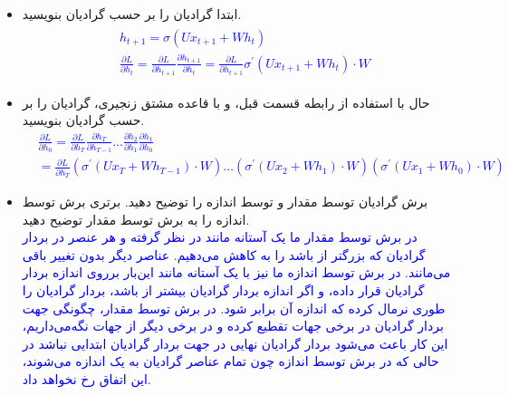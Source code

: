 \documentclass[12pt]{article}
\begin{document}
\begin{enumerate}
    \begin{itemize}
        \item ابتدا گرادیان  را بر حسب گرادیان  بنویسید.\\
        \textcolor{blue}{
        $$
            \begin{aligned}
            &\begin{gathered}
            h_{t+1}=\sigma\left(U x_{t+1}+W h_t\right) \\
            \frac{\partial L}{\partial h_t}=\frac{\partial L}{\partial h_{t+1}} \frac{\partial h_{t+1}}{\partial h_t}=\frac{\partial L}{\partial h_{t+1}} \sigma^{\prime}\left(U x_{t+1}+W h_t\right) \cdot W
            \end{gathered}
            \end{aligned}
        $$
        }
        \item 	حال با استفاده از رابطه قسمت قبل، و با قاعده مشتق زنجیری، گرادیان  را بر حسب گرادیان  بنویسید.\\
        \textcolor{blue}{
        $$
            \begin{aligned}
            & \frac{\partial L}{\partial h_0}=\frac{\partial L}{\partial h_T} \frac{\partial h_T}{\partial h_{T-1}} \ldots \frac{\partial h_2}{\partial h_1} \frac{\partial h_1}{\partial h_0} \\
            & =\frac{\partial L}{\partial h_T}\left(\sigma^{\prime}\left(U x_T+W h_{T-1}\right) \cdot W\right) \ldots\left(\sigma^{\prime}\left(U x_2+W h_1\right) \cdot W\right)\left(\sigma^{\prime}\left(U x_1+W h_0\right) \cdot W\right)
            \end{aligned}
        $$
        }
        \item برش گرادیان توسط مقدار و توسط اندازه را توضیح دهید. برتری برش توسط اندازه را به برش توسط مقدار توضیح دهید.\\
        \textcolor{blue}{
        در برش توسط مقدار ما یک آستانه مانند در نظر گرفته و هر عنصر در بردار گرادیان که بزرگتر از باشد را به کاهش می‌دهیم. عناصر دیگر بدون تغییر باقی می‌مانند. در برش توسط اندازه ما نیز با یک آستانه مانند این‌بار برروی اندازه بردار گرادیان قرار داده، و اگر اندازه بردار گرادیان بیشتر از باشد، بردار گرادیان را طوری نرمال کرده که اندازه آن برابر شود. در برش توسط مقدار، چگونگی جهت بردار گرادیان در برخی جهات تقطیع کرده و در برخی دیگر از جهات نگه‌می‌داریم، این کار باعث می‌شود بردار گرادیان نهایی در جهت بردار گرادیان ابتدایی نباشد در حالی که در برش توسط اندازه چون تمام عناصر گرادیان به یک اندازه  می‌شوند، این اتفاق رخ نخواهد داد.
        }
    \end{itemize}
    	

\end{enumerate}
\end{document}
